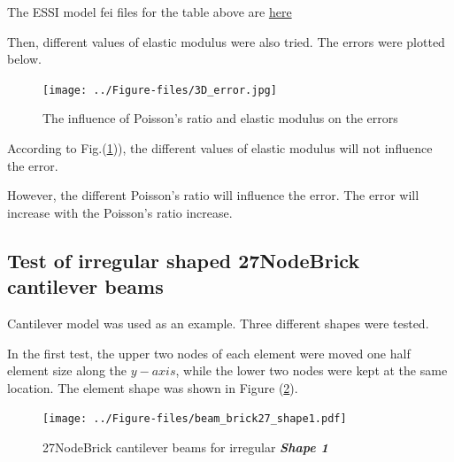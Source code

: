 \documentclass[fleqn,11pt]{article}
\begin{document}
The ESSI model fei files for the table above are \href{https://github.com/yuan-energy/ESSI_Verification/blob/master/27NodeBrick/cantilever_different_Poisson/cantilever_different_Poisson.tar.gz?raw=true}{here}



\newpage
Then, different values of elastic modulus were also tried. The errors were plotted below.
\begin{figure}[H]
  \centering
  \texttt{[image: ../Figure-files/3D\_error.jpg]}
  \caption{The influence of Poisson's ratio and elastic modulus on the errors} 
  \label{fig The influence of Poisson's ratio and elastic modulus on the errors}
\end{figure}


According to Fig.(\ref{fig The influence of Poisson's ratio and elastic modulus on the errors})), the different values of elastic modulus will not influence the error. 

However, the different Poisson's ratio will influence the error. The error will increase with the Poisson's ratio increase. 





\newpage
\subsection{Test of irregular shaped 27NodeBrick cantilever beams}

Cantilever model was used as an example. 
Three different shapes were tested. 


In the first test, the upper two nodes of each element were moved one half element size along the $y-axis$, while the lower two nodes were kept at the same location.  The element shape was shown in Figure (\ref{fig irregular shape 1 27NodeBrick cantilever beams }).

\begin{figure}[H]
  \centering
  \texttt{[image: ../Figure-files/beam\_brick27\_shape1.pdf]}
  \caption{27NodeBrick cantilever beams for irregular \textbf{\emph{Shape 1}} }
  \label{fig irregular shape 1 27NodeBrick cantilever beams }
\end{figure}
\end{document}
